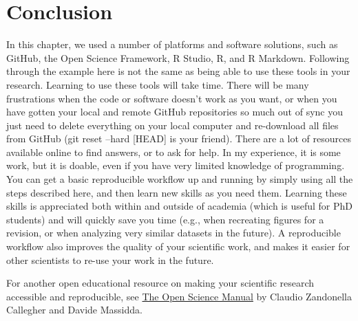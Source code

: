 \documentclass[
  oneside]{krantz}
\begin{document}
\hypertarget{conclusion-1}{%
\section{Conclusion}\label{conclusion-1}}

In this chapter, we used a number of platforms and software solutions, such as GitHub, the Open Science Framework, R Studio, R, and R Markdown. Following through the example here is not the same as being able to use these tools in your research. Learning to use these tools will take time. There will be many frustrations when the code or software doesn't work as you want, or when you have gotten your local and remote GitHub repositories so much out of sync you just need to delete everything on your local computer and re-download all files from GitHub (git reset --hard {[}HEAD{]} is your friend). There are a lot of resources available online to find answers, or to ask for help. In my experience, it is some work, but it is doable, even if you have very limited knowledge of programming. You can get a basic reproducible workflow up and running by simply using all the steps described here, and then learn new skills as you need them. Learning these skills is appreciated both within and outside of academia (which is useful for PhD students) and will quickly save you time (e.g., when recreating figures for a revision, or when analyzing very similar datasets in the future). A reproducible workflow also improves the quality of your scientific work, and makes it easier for other scientists to re-use your work in the future.

For another open educational resource on making your scientific research accessible and reproducible, see \href{https://arca-dpss.github.io/manual-open-science/}{The Open Science Manual} by Claudio Zandonella Callegher and Davide Massidda.

  

\backmatter
\printindex
\end{document}
